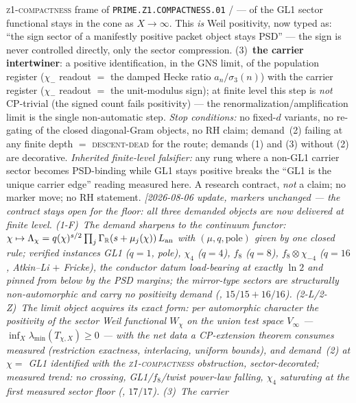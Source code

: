 {\textsc{z1-compactness} frame of
\texttt{PRIME.Z1.COMPACTNESS.01} /
 --- of the GL1 sector
functional stays in the cone as $X\to\infty$.  This \emph{is} Weil
positivity, now typed as: ``the sign sector of a manifestly
positive packet object stays PSD'' --- the sign is never
controlled directly, only the sector compression.
(3)~\textbf{the carrier intertwiner}: a positive identification,
in the GNS limit, of the population register ($\chi_-$ readout $=$
the damped Hecke ratio $a_n/\sigma_3(n)$) with the carrier
register ($\chi_-$ readout $=$ the unit-modulus sign); at finite
level this step is \emph{not} CP-trivial (the signed count fails
positivity) --- the renormalization/amplification limit is the
single non-automatic step.  \emph{Stop conditions:} no fixed-$d$
variants, no re-gating of the closed diagonal-Gram objects, no RH
claim; demand~(2) failing at any finite depth $=$
\textsc{descent-dead} for the route; demands (1) and (3) without
(2) are decorative.  \emph{Inherited finite-level falsifier:} any
rung where a non-GL1 carrier sector becomes PSD-binding while GL1
stays positive breaks the ``GL1 is the unique carrier edge''
reading measured here.  A research contract, \emph{not} a claim;
no marker move; no RH statement.
\emph{[2026-08-06 update, markers unchanged --- the contract stays
open for the floor: all three demanded objects are now delivered
at finite level.  (1-F)~The demand sharpens to the \emph{continuum
functor}: $\chi\mapsto\Lambda_\chi=q(\chi)^{s/2}\prod_j
\Gamma_{\mathbb R}(s+\mu_j(\chi))\,L_{\rm an}$ with
$(\mu,q,\text{pole})$ given by one closed rule; verified instances
GL1 ($q{=}1$, pole), $\chi_4$ ($q{=}4$), $f_8$ ($q{=}8$),
$f_8\otimes\chi_{-4}$ ($q{=}16$, Atkin--Li $+$ Fricke), the
conductor datum load-bearing at exactly $\ln2$ and pinned from
below by the PSD margins; the mirror-type sectors are structurally
non-automorphic and carry no positivity demand
(, $15/15+16/16$).
(2-L/2-Z)~The limit object acquires its exact form: per
automorphic character the positivity of the sector Weil functional
$W_\chi$ on the union test space $V_\infty$ ---
$\inf_X\lambda_{\min}(T_{\chi,X})\ge0$ --- with the net data a
CP-extension theorem consumes \emph{measured} (restriction
exactness, interlacing, uniform bounds), and demand~(2) at
$\chi=$ GL1 identified with the \textsc{z1-compactness}
obstruction, sector-decorated; measured trend: no crossing,
GL1/$f_8$/twist power-law falling, $\chi_4$ saturating at the
first measured sector floor
(, $17/17$).  (3)~The carrier
}}
